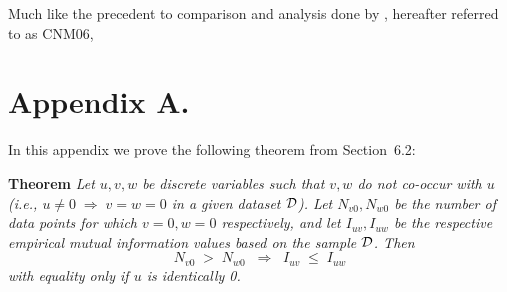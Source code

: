 \documentclass[twoside,11pt]{article}
\newcommand{\dataset}{{\cal D}}
\begin{document}
Much like the precedent to comparison and analysis done by \cite{cnm:06}, 
hereafter referred to as CNM06, 






\newpage

\appendix
\section*{Appendix A.}
\label{app:theorem}



In this appendix we prove the following theorem from
Section~6.2:

\noindent
{\bf Theorem} {\it Let $u,v,w$ be discrete variables such that $v, w$ do
not co-occur with $u$ (i.e., $u\neq0\;\Rightarrow \;v=w=0$ in a given
dataset $\dataset$). Let $N_{v0},N_{w0}$ be the number of data points for
which $v=0, w=0$ respectively, and let $I_{uv},I_{uw}$ be the
respective empirical mutual information values based on the sample
$\dataset$. Then
\[
	N_{v0} \;>\; N_{w0}\;\;\Rightarrow\;\;I_{uv} \;\leq\;I_{uw}
\]
with equality only if $u$ is identically 0.} \hfill\BlackBox
\end{document}
